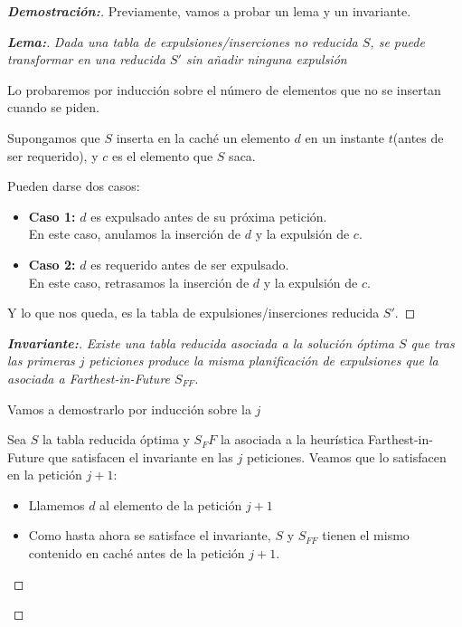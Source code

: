 \documentclass[a4paper, 11pt]{article} %
\begin{document}
  \begin{proof}[\textbf{Demostración:}]
  	Previamente, vamos a probar un lema y un invariante.
  
	  \begin{proof}[\textbf{Lema:}]
	    \textit{
	      Dada una tabla de expulsiones/inserciones no reducida $S$, se puede transformar en una reducida $S'$ sin añadir ninguna expulsión  
	    }
	    
	    Lo probaremos por inducción sobre el número de elementos que no se insertan cuando se piden.
	    
	    Supongamos que $S$ inserta en la caché un elemento $d$ en un instante $t$(antes de ser requerido), y $c$
	    es el elemento que $S$ saca.
	    
	    Pueden darse dos casos:
	    \begin{itemize}
	      \item \textbf{Caso 1: } $d$ es expulsado antes de su próxima petición.\\
	      En este caso, anulamos la inserción de $d$ y la expulsión de $c$.
	      \item \textbf{Caso 2: } $d$ es requerido antes de ser expulsado. \\
	      En este caso, retrasamos la inserción de $d$ y la expulsión de $c$.
	    \end{itemize}
	    
	    Y lo que nos queda, es la tabla de expulsiones/inserciones reducida $S'$.
	    
	  \end{proof}
	
	\begin{proof}[\textbf{Invariante:}]
	  \textit{
	    Existe una tabla reducida asociada a la solución óptima $S$ que tras las primeras $j$ peticiones produce la misma planificación de expulsiones que la asociada a Farthest-in-Future $S_{FF}$.
	  }
	  
	  Vamos a demostrarlo por inducción sobre la $j$
	  
	  Sea $S$ la tabla reducida óptima y $S_FF$ la asociada a la heurística Farthest-in-Future que satisfacen el invariante en las $j$ peticiones.
	  Veamos que lo satisfacen en la petición $j+1$:
	  
	  \begin{itemize}
	  	\item Llamemos $d$ al elemento de la petición $j+1$
	  	\item Como hasta ahora se satisface el invariante, $S$ y $S_{FF}$ tienen el mismo contenido en caché antes de la petición $j+1$.
	  

\end{itemize}
\end{proof}
\end{proof}
\end{document}
